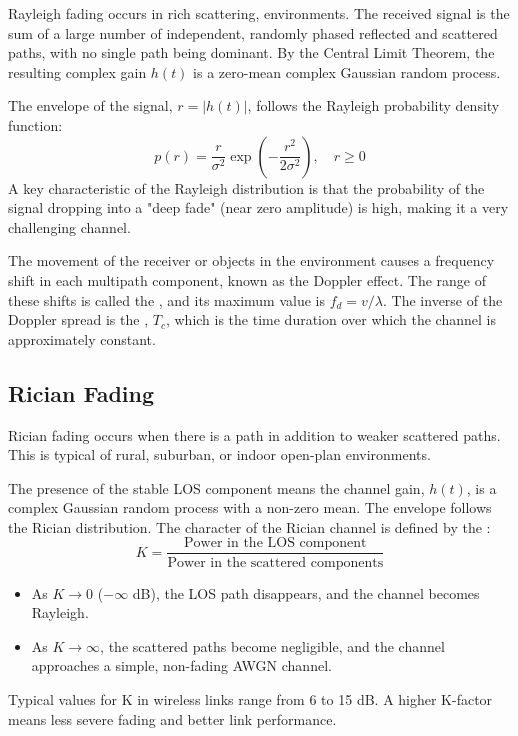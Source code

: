 Rayleigh fading occurs in rich scattering,  environments. The received signal is the sum of a large number of independent, randomly phased reflected and scattered paths, with no single path being dominant. By the Central Limit Theorem, the resulting complex gain $h(t)$ is a zero-mean complex Gaussian random process.

The envelope of the signal, $r = |h(t)|$, follows the Rayleigh probability density function:
\begin{equation}
    p(r) = \frac{r}{\sigma^2} \exp\left(-\frac{r^2}{2\sigma^2}\right), \quad r \geq 0
\end{equation}
A key characteristic of the Rayleigh distribution is that the probability of the signal dropping into a "deep fade" (near zero amplitude) is high, making it a very challenging channel.

The movement of the receiver or objects in the environment causes a frequency shift in each multipath component, known as the Doppler effect. The range of these shifts is called the , and its maximum value is $f_d = v/\lambda$. The inverse of the Doppler spread is the , $T_c$, which is the time duration over which the channel is approximately constant.


\subsection{Rician Fading}

Rician fading occurs when there is a  path in addition to weaker scattered paths. This is typical of rural, suburban, or indoor open-plan environments.

The presence of the stable LOS component means the channel gain, $h(t)$, is a complex Gaussian random process with a non-zero mean. The envelope follows the Rician distribution. The character of the Rician channel is defined by the :
\begin{equation}
    K = \frac{\text{Power in the LOS component}}{\text{Power in the scattered components}}
\end{equation}
\begin{itemize}
    \item As $K \to 0$ ($-\infty$ dB), the LOS path disappears, and the channel becomes Rayleigh.
    \item As $K \to \infty$, the scattered paths become negligible, and the channel approaches a simple, non-fading AWGN channel.
\end{itemize}
Typical values for K in wireless links range from 6 to 15 dB. A higher K-factor means less severe fading and better link performance.


